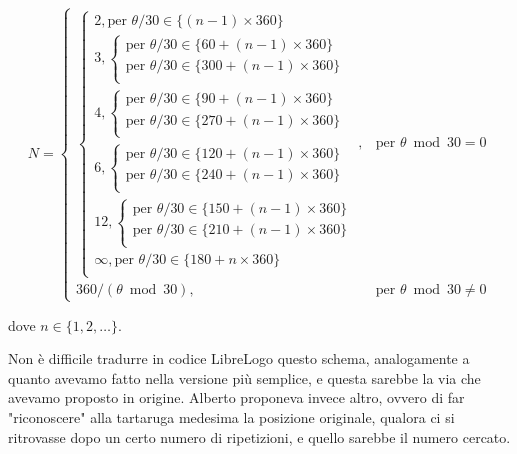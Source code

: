 \begin{equation} \label{eq:2}
N=
\begin{cases}
   \begin{cases}
      2, \text{per } \theta/30 \in \{(n-1) \times 360\} \\
      3, \begin{cases}
            \text{per } \theta/30 \in \{60+(n-1) \times 360\}  \\
            \text{per } \theta/30 \in \{300+(n-1) \times 360\} \\
         \end{cases} \\
      4, \begin{cases}
            \text{per } \theta/30 \in \{90+(n-1) \times 360\}  \\
            \text{per } \theta/30 \in \{270+(n-1) \times 360\} \\
         \end{cases} \\
      6, \begin{cases}
            \text{per } \theta/30 \in \{120+(n-1) \times 360\}  \\
            \text{per } \theta/30 \in \{240+(n-1) \times 360\} \\
         \end{cases} \\
      12,\begin{cases}
            \text{per } \theta/30 \in \{150+(n-1) \times 360\}  \\
            \text{per } \theta/30 \in \{210+(n-1) \times 360\} \\
         \end{cases} \\
      \infty, \text{per } \theta/30 \in \{180+n \times 360\} \\
   \end{cases}, & \text{per } \theta \bmod 30 = 0  \\
   360/(\theta \bmod 30), & \text{per } \theta \bmod 30 \ne 0
\end{cases}
\end{equation}

dove $n \in \{1,2,\dots\}$.

Non è difficile tradurre in codice LibreLogo questo schema, analogamente a
quanto avevamo fatto nella versione più semplice, e questa sarebbe la via che
avevamo proposto in origine. Alberto proponeva invece altro, ovvero di far
"riconoscere" alla tartaruga medesima la posizione originale, qualora ci si
ritrovasse dopo un certo numero di ripetizioni, e quello sarebbe il numero
cercato.

